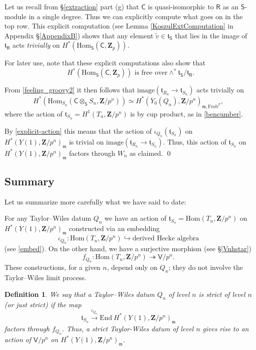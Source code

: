 \documentclass[10pt]{amsart}
\newcommand{\Z}{\mathbf{Z}}
\newcommand{\Hom}{\mathrm{Hom}}
\newcommand{\End}{\mathrm{End}}
\newcommand{\Frob}{\mathrm{Frob}}
\newcommand{\Vinf}{\mathsf{V}}
\newcommand{\Cinf}{\mathsf{C}}
\newcommand{\Sinf}{\mathsf{S}}
\newcommand{\Rinf}{\mathsf{R}}
\newtheorem{Definition}[subsection]{Definition}
\theoremstyle{remark}
\begin{document}
%
%
%
   Let us recall from \S \ref{extraction} part (g)  that $\mathsf{C}$ is quasi-isomorphic to $\mathsf{R}$ as an $\mathsf{S}$-module in a single degree.  
   Thus we can explicitly compute what goes on in the top row. This explicit computation
   (see Lemma  \ref{KoszulExtComputation} in Appendix \S \ref{AppendixB}) shows that 
   any element   $\tilde{v} \in \mathfrak{t}_{\Sinf}$
that lies in the image of $\mathfrak{t}_{\Rinf}$  acts {\em trivially}  on $H^*(\Hom_{\Sinf}(\Cinf, \Z_p))$.

 For later use, note that these  explicit computations also show that 
\begin{equation} \label{watney} \mbox{ $H^*(\Hom_{\Sinf}(\Cinf, \Z_p))$ 
is free over
$\wedge^* \mathfrak{t}_{\Sinf}/\mathfrak{t}_{\Rinf}$.} \end{equation}

From 
\eqref{feeling_groovy2}
it then follows that 
 $\mathrm{image}(\mathfrak{t}_{R_n} \rightarrow \mathfrak{t}_{S_n})$  
acts trivially on  $$H^*(\Hom_{S_n}(\Cinf \otimes_{\Sinf} S_n, \Z/p^n)) \simeq H^*(Y_0(Q_n), \Z/p^n)_{\mathfrak{m}, \Frob^T},$$
where the action of $\mathfrak{t}_{S_n} = H^1(T_n, \Z/p^n)$  is by cup product, as in \eqref{bencumber}. 

By \eqref{explicit-action} this means that the action of $\iota_{Q_n}(\mathfrak{t}_{S_n})$
on $H^*(Y(1), \Z/p^n)_{\mathfrak{m}}$   is trivial on  $\mathrm{image}(\mathfrak{t}_{R_n} \rightarrow \mathfrak{t}_{S_n})$. 
 Thus, this action of $\mathfrak{t}_{S_n}$ on $H^*(Y(1), \Z/p^n)_{\mathfrak{m}}$ factors  
   through $W_n$ as claimed.  \qed   
   
   
  
\subsection{Summary} \label{Strictsequence}
Let us summarize more carefully what we have said to date:

For any Taylor--Wiles datum $Q_n$ we have an action of $\mathfrak{t}_{S_n} = \Hom(T_n, \Z/p^n)$ on $H^*(Y(1), \Z/p^n)_{\mathfrak{m}}$  
constructed via an embedding $$\iota_{Q_n}:\Hom(T_n, \Z/p^n) \hookrightarrow \mbox{derived Hecke algebra} $$
 (see \eqref{embed}). 
On the other hand, we have a  surjective morphism  (see \S \ref{Vnhstar}) 
$$ f_{Q_n}: \Hom(T_n, \Z/p^n) \twoheadrightarrow \Vinf/p^n.$$ 
 These constructions, for a given $n$, depend only on $Q_n$; they do not involve the Taylor--Wiles limit process.


\begin{Definition} \label{strictdef}  
We say that a Taylor--Wiles datum $Q_n$ of level $n$ is {\em strict of level $n$} (or just {\em strict})
if the map   
$$ \mathfrak{t}_{S_n} \stackrel{ \iota_{Q_n}}{\longrightarrow} \End \ H^*(Y(1), \Z/p^n)_{\mathfrak{m}} $$
   factors through $f_{Q_n}$. Thus, a strict Taylor-Wiles datum of level $n$
gives rise to an action of $\Vinf/p^n$ on $H^*(Y(1), \Z/p^n)_{\mathfrak{m}}$.  
\end{Definition}
\end{document}
